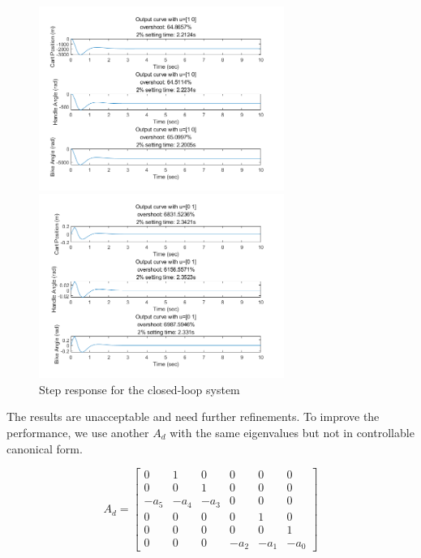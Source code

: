 \documentclass[hyperref]{article}
\theoremstyle{nonumberplain}
\begin{document}
	\begin{figure}[htbp]
		\centering
		\begin{minipage}[t]{0.48\textwidth}
			\centering
			\includegraphics[width=8cm]{fig3.png}
		\end{minipage}
		\begin{minipage}[t]{0.48\textwidth}
			\centering
			\includegraphics[width=8cm]{fig4.png}
		\end{minipage}
	\caption{Step response for the closed-loop system}
	\label{fig3}
	\end{figure}
	
	The results are unacceptable and need further refinements. To improve the performance, we use another $A_{d}$ with the same eigenvalues but not in controllable canonical form.
	
	\begin{equation}
	A_{d}=\begin{bmatrix}
	0 &1  &0  &0  &0  &0 \\ 
	0 &0  &1  &0  &0  &0 \\ 
	-a_{5} &-a_{4}  &-a_{3}  &0  &0  &0 \\ 
	0 &0  &0  &0  &1  &0 \\ 
	0 &0  &0  &0  &0  &1 \\ 
	0 &0  &0  & -a_{2} &-a_{1}  & -a_{0}
	\end{bmatrix}
	\nonumber
	\end{equation}
	
\end{document}
